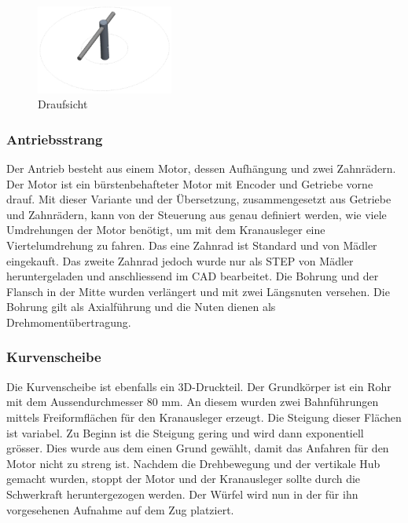 \documentclass[../../main.tex]{subfiles}
\begin{document}
        \begin{figure}[H]
            \centering
            \includegraphics[width=0.4\textwidth]{../../images/Kran/Top_3.JPG}
            \caption {Draufsicht}
        \end{figure}



    \subsubsection{Antriebsstrang}
        Der Antrieb besteht aus einem Motor, dessen Aufhängung und zwei Zahnrädern. Der Motor ist ein bürstenbehafteter
        Motor mit Encoder und Getriebe vorne drauf. Mit dieser Variante und der Übersetzung, zusammengesetzt aus Getriebe
        und Zahnrädern, kann von der Steuerung aus genau definiert werden, wie viele Umdrehungen der Motor benötigt, um
        mit dem Kranausleger eine Viertelumdrehung zu fahren. Das eine Zahnrad ist Standard und von Mädler eingekauft.
        Das zweite Zahnrad jedoch wurde nur als STEP von Mädler heruntergeladen und anschliessend im CAD bearbeitet. Die
        Bohrung und der Flansch in der Mitte wurden verlängert und mit zwei Längsnuten versehen. Die Bohrung gilt als
        Axialführung und die Nuten dienen als Drehmomentübertragung.


        \subsubsection{Kurvenscheibe}
        Die Kurvenscheibe ist ebenfalls ein 3D-Druckteil. Der Grundkörper ist ein Rohr mit dem Aussendurchmesser 80 mm. An diesem wurden zwei Bahnführungen mittels Freiformflächen für den Kranausleger erzeugt. Die Steigung dieser Flächen ist variabel. Zu Beginn ist die Steigung gering und wird dann exponentiell grösser. Dies wurde aus dem einen Grund gewählt, damit das Anfahren für den Motor nicht zu streng ist. Nachdem die Drehbewegung und der vertikale Hub gemacht wurden, stoppt der Motor und der Kranausleger sollte durch die Schwerkraft heruntergezogen werden. Der Würfel wird nun in der für ihn vorgesehenen Aufnahme auf dem Zug platziert.\\
\end{document}
